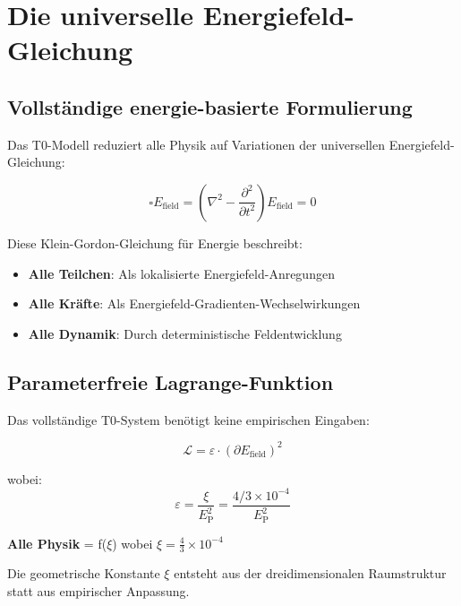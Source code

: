 \documentclass[12pt,a4paper]{report}
\newcommand{\EP}{E_{\text{P}}}            %
\begin{document}
	\section{Die universelle Energiefeld-Gleichung}
	\label{sec:universal_energy_field_equation}
	
	\subsection{Vollständige energie-basierte Formulierung}
	\label{subsec:complete_energy_formulation}
	
	Das T0-Modell reduziert alle Physik auf Variationen der universellen Energiefeld-Gleichung:
	
	\begin{equation}
		\boxed{\square E_{\text{field}} = \left(\nabla^2 - \frac{\partial^2}{\partial t^2}\right) E_{\text{field}} = 0}
		\label{eq:universal_field_equation}
	\end{equation}
	
	Diese Klein-Gordon-Gleichung für Energie beschreibt:
	\begin{itemize}
		\item \textbf{Alle Teilchen}: Als lokalisierte Energiefeld-Anregungen
		\item \textbf{Alle Kräfte}: Als Energiefeld-Gradienten-Wechselwirkungen
		\item \textbf{Alle Dynamik}: Durch deterministische Feldentwicklung
	\end{itemize}
	
	\subsection{Parameterfreie Lagrange-Funktion}
	\label{subsec:parameter_free_lagrangian}
	
	Das vollständige T0-System benötigt keine empirischen Eingaben:
	
	\begin{equation}
		\boxed{\mathcal{L} = \varepsilon \cdot (\partial E_{\text{field}})^2}
	\end{equation}
	
	wobei:
	\begin{equation}
		\varepsilon = \frac{\xi}{\EP^2} = \frac{4/3 \times 10^{-4}}{\EP^2}
	\end{equation}
	
	\begin{tcolorbox}[colback=green!5!white,colframe=green!75!black,title=Parameterfreie Physik]
		\textbf{Alle Physik} = f($\xi$) wobei $\xi = \frac{4}{3} \times 10^{-4}$
		
		Die geometrische Konstante $\xi$ entsteht aus der dreidimensionalen Raumstruktur statt aus empirischer Anpassung.
	\end{tcolorbox}
	
\end{document}
